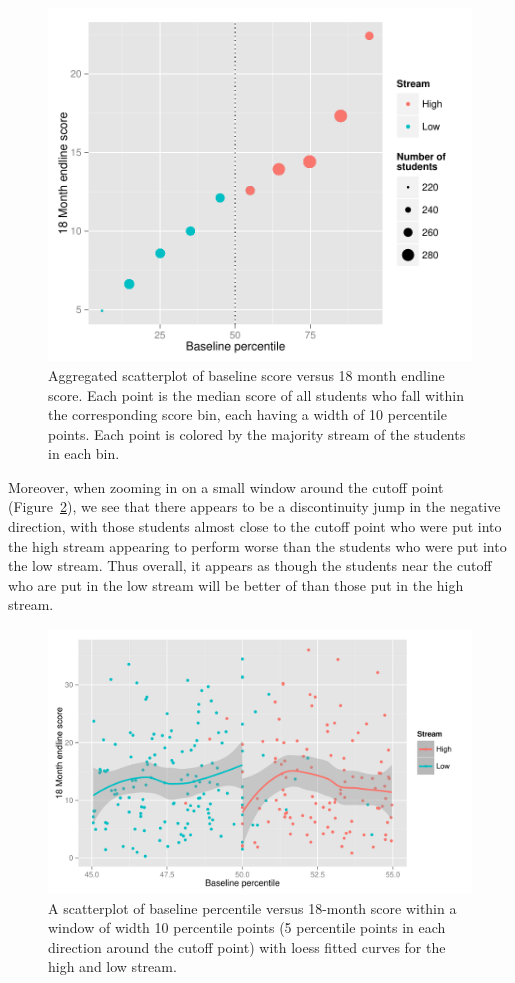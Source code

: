 \documentclass[11pt]{article}
\begin{document}
  \begin{figure}[H]
 \centering
 \includegraphics[scale=0.7]{RD_initial.pdf}
 \caption{Aggregated scatterplot of baseline score versus 18 month endline score. Each point is the median score of all students who fall within the corresponding score bin, each having a width of 10 percentile points. Each point is colored by the majority stream of the students in each bin.}
 \label{fig:RD_big}
 \end{figure}
 
Moreover, when zooming in on a small window around the cutoff point (Figure~\ref{fig:RD_scatter}), we see that there appears to be a discontinuity jump in the negative direction, with those students almost close to the cutoff point who were put into the high stream appearing to perform worse than the students who were put into the low stream. Thus overall, it appears as though the students near the cutoff who are put in the low stream will be better of than those put in the high stream.



  \begin{figure}[H]
 \centering
 \includegraphics[scale=0.6]{RD_scatter.pdf}
 \caption{A scatterplot of baseline percentile versus 18-month score within a window of width 10 percentile points (5 percentile points in each direction around the cutoff point) with loess fitted curves for the high and low stream.}
 \label{fig:RD_scatter}
 \end{figure}
 
\end{document}
